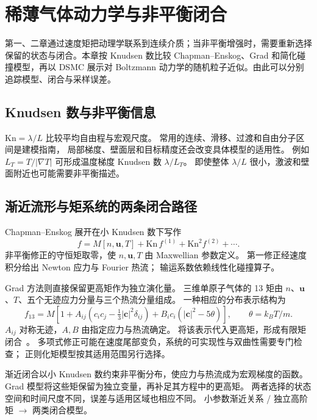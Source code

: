 \chapter{稀薄气体动力学与非平衡闭合}\label{ch:17}
\begin{chaptersummary}
第一、二章通过速度矩把动理学联系到连续介质；当非平衡增强时，需要重新选择保留的状态与闭合。本章按 Knudsen 数比较 Chapman--Enskog、Grad 和简化碰撞模型，再以 DSMC 展示对 Boltzmann 动力学的随机粒子近似。由此可以分别追踪模型、闭合与采样误差。
\end{chaptersummary}

\section{Knudsen 数与非平衡信息}
$\mathrm{Kn}=\lambda/L$ 比较平均自由程与宏观尺度。
常用的连续、滑移、过渡和自由分子区间是建模指南，
局部梯度、壁面层和目标精度还会改变具体模型的适用性。
例如 $L_T=T/|\nabla T|$ 可形成温度梯度 Knudsen 数 $\lambda/L_T$。
即使整体 $\lambda/L$ 很小，激波和壁面附近也可能需要非平衡描述。

\section{渐近流形与矩系统的两条闭合路径}
Chapman--Enskog 展开在小 Knudsen 数下写作
\[
f=M[n,\bm u,T]+\mathrm{Kn}\,f^{(1)}
+\mathrm{Kn}^2f^{(2)}+\cdots.
\]
非平衡修正的守恒矩取零，使 $n,\bm u,T$ 由 Maxwellian 参数定义。
第一修正经速度积分给出 Newton 应力与 Fourier 热流；
输运系数依赖线性化碰撞算子。

Grad 方法则直接保留更高矩作为独立演化量。
三维单原子气体的 13 矩由
$n$、$\bm u$、$T$、五个无迹应力分量与三个热流分量组成。
一种相应的分布表示结构为
\[
f_{13}=M\left[1+
A_{ij}\left(c_ic_j-\tfrac13|\bm c|^2\delta_{ij}\right)
+B_i c_i(|\bm c|^2-5\theta)\right],
\qquad \theta=k_BT/m.
\]
$A_{ij}$ 对称无迹，$A,B$ 由指定应力与热流确定。
将该表示代入更高矩，形成有限矩闭合~\cite{grad1949}。
多项式修正可能在速度尾部变负，系统的可实现性与双曲性需要专门检查；
正则化矩模型按其适用范围另行选择。

{渐近闭合以小 Knudsen 数约束非平衡分布，使应力与热流成为宏观梯度的函数。
Grad 模型将这些矩保留为独立变量，再补足其方程中的更高矩。
两者选择的状态空间和时间尺度不同，误差与适用区域也相应不同。}
{小参数渐近关系 / 独立高阶矩 $\longrightarrow$ 两类闭合模型。}

